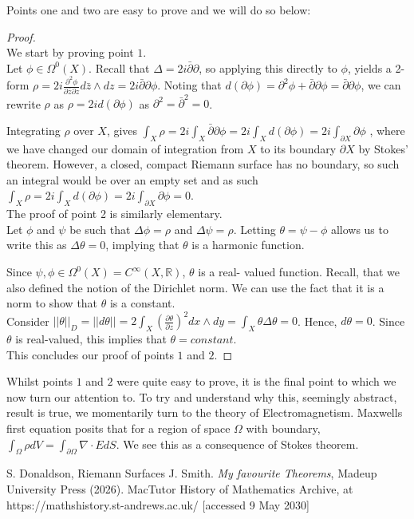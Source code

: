 \documentclass[a4paper,12pt]{report}
\theoremstyle{plain}
\theoremstyle{definition}
\begin{document}
Points one and two are easy to prove and we will do so below:
\begin{proof} ~\\
We start by proving point $1.$ ~\\
Let $\phi \in \Omega^0(X)$. Recall that
$\Delta =2i\bar{\partial}\partial$, so 
applying this directly to $\phi$, yields a 2-form
$\rho = 2i\frac{\partial^2\phi}{\partial \bar{z}\partial z}d\bar{z}\wedge
dz = 2i \bar{\partial}\partial \phi$. 
Noting that
$d(\partial \phi) = \partial^2 \phi + \bar{\partial}\partial\phi =
\bar{\partial}\partial \phi $, we can rewrite $\rho$ as
$\rho = 2id(\partial \phi)$ as $\partial^2 = \bar{\partial}^2 = 0$.

Integrating $\rho$ over $X$, gives $\int_X \rho = 2i\int_X
\bar{\partial}\partial \phi = 2i \int_X d(\partial \phi) = 2i
\int_{\partial X}\partial \phi$
, where we have changed our domain of integration from $X$ to its
boundary $\partial X$ by Stokes' theorem. However, a closed, compact
Riemann surface has no boundary, so such an integral would be over an
empty set and as such $\int_X \rho = 2i\int_X d(\partial \phi) =
2i\int_{\partial X} \partial \phi = 0$. ~\\

The proof of point 2 is similarly elementary. ~\\
Let $\phi$ and $\psi$ be such that $\Delta \phi = \rho$ and $\Delta \psi
= \rho$. 
Letting $\theta = \psi - \phi$ allows us to write this as $\Delta \theta
= 0$, 
implying that $\theta$ is a harmonic function.

Since $\psi,\phi \in \Omega^0(X)=C^{\infty}(X,\mathbb{R})$, $\theta$ is a
real-
valued function.
Recall, that we also defined the notion of the Dirichlet norm. We can use
the 
fact that it is a norm to show that $\theta$ is a constant. ~\\
Consider $||\theta||_D = ||d\theta|| = 2 \int_X (\frac{\partial
\theta}{\partial 
z})^2 dx \wedge dy = \int_X \theta \Delta \theta = 0$.
Hence, $d\theta = 0$. Since $\theta$ is real-valued, this implies that 
$\theta = constant$. ~\\
This concludes our proof of points $1$ and $2$. 
\end{proof}
Whilst points $1$ and $2$ were quite easy to prove, it is the final point
to which we now turn our attention to.
To try and understand why this, seemingly abstract, result is true, we
momentarily turn to the theory of Electromagnetism. Maxwells first
equation posits that for a region of space $\Omega$ with boundary, $
\int_\Omega \rho dV = \int_{\partial \Omega} \nabla \cdot E dS $. We see
this as a consequence of Stokes theorem.


%
\begin{thebibliography}{99}
 S. Donaldson, Riemann Surfaces
 J. Smith. {\em My favourite Theorems}, Madeup University
Press (2026).
%
 MacTutor History of Mathematics Archive, at
https://mathshistory.st-andrews.ac.uk/ [accessed 9 May 2030]
\end{thebibliography}
\end{document}
